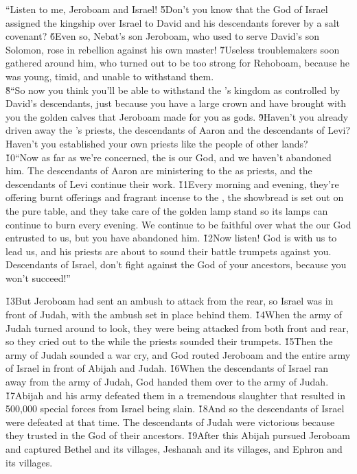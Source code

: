 \begin{poetry}
\poeml ``Listen to me, Jeroboam and Israel! \v{5}Don't you know that the  God of Israel assigned the kingship over Israel to David and his descendants forever by a salt covenant? \v{6}Even so, Nebat's son Jeroboam, who used to serve David's son Solomon, rose in rebellion against his own master! \v{7}Useless troublemakers soon gathered around him, who turned out to be too strong for Rehoboam, because he was young, timid, and unable to withstand them. \\
\poeml \v{8}``So now you think you'll be able to withstand the 's kingdom as controlled by David's descendants, just because you have a large crown and have brought with you the golden calves that Jeroboam made for you as gods. \v{9}Haven't you already driven away the 's priests, the descendants of Aaron and the descendants of Levi? Haven't you established your own priests like the people of other lands? \\
\poeml \v{10}``Now as far as we're concerned, the  is our God, and we haven't abandoned him. The descendants of Aaron are ministering to the  as priests, and the descendants of Levi continue their work. \v{11}Every morning and evening, they're offering burnt offerings and fragrant incense to the , the showbread is set out on the pure table, and they take care of the golden lamp stand so its lamps can continue to burn every evening. We continue to be faithful over what the  our God entrusted to us, but you have abandoned him. \v{12}Now listen! God is with us to lead us, and his priests are about to sound their battle trumpets against you. Descendants of Israel, don't fight against the  God of your ancestors, because you won't succeed!''
\end{poetry}

\v{13}But Jeroboam had sent an ambush to attack from the rear, so Israel was in front of Judah, with the ambush set in place behind them. \v{14}When the army of Judah turned around to look, they were being attacked from both front and rear, so they cried out to the  while the priests sounded their trumpets. \v{15}Then the army of Judah sounded a war cry, and God routed Jeroboam and the entire army of Israel in front of Abijah and Judah. \v{16}When the descendants of Israel ran away from the army of Judah, God handed them over to the army of Judah. \v{17}Abijah and his army defeated them in a tremendous slaughter that resulted in 500,000 special forces from Israel being slain. \v{18}And so the descendants of Israel were defeated at that time. The descendants of Judah were victorious because they trusted in the  God of their ancestors. \v{19}After this Abijah pursued Jeroboam and captured Bethel and its villages, Jeshanah and its villages, and Ephron and its villages.

